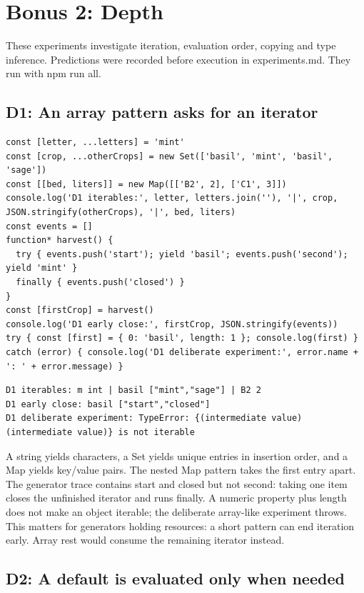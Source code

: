 \documentclass[
  10pt,
  a4paper,
]{article}
\begin{document}
\section{Bonus 2: Depth}\label{bonus-2-depth}

These experiments investigate iteration, evaluation order, copying and
type inference. Predictions were recorded before execution in
experiments.md. They run with npm run all.

\subsection{D1: An array pattern asks for an
iterator}\label{d1-an-array-pattern-asks-for-an-iterator}

\begin{lstlisting}
const [letter, ...letters] = 'mint'
const [crop, ...otherCrops] = new Set(['basil', 'mint', 'basil', 'sage'])
const [[bed, liters]] = new Map([['B2', 2], ['C1', 3]])
console.log('D1 iterables:', letter, letters.join(''), '|', crop, JSON.stringify(otherCrops), '|', bed, liters)
const events = []
function* harvest() {
  try { events.push('start'); yield 'basil'; events.push('second'); yield 'mint' }
  finally { events.push('closed') }
}
const [firstCrop] = harvest()
console.log('D1 early close:', firstCrop, JSON.stringify(events))
try { const [first] = { 0: 'basil', length: 1 }; console.log(first) }
catch (error) { console.log('D1 deliberate experiment:', error.name + ': ' + error.message) }
\end{lstlisting}

\begin{lstlisting}
D1 iterables: m int | basil ["mint","sage"] | B2 2
D1 early close: basil ["start","closed"]
D1 deliberate experiment: TypeError: {(intermediate value)(intermediate value)} is not iterable
\end{lstlisting}

A string yields characters, a Set yields unique entries in insertion
order, and a Map yields key/value pairs. The nested Map pattern takes
the first entry apart. The generator trace contains start and closed but
not second: taking one item closes the unfinished iterator and runs
finally. A numeric property plus length does not make an object
iterable; the deliberate array-like experiment throws. This matters for
generators holding resources: a short pattern can end iteration early.
Array rest would consume the remaining iterator instead.

\subsection{D2: A default is evaluated only when
needed}\label{d2-a-default-is-evaluated-only-when-needed}
\end{document}
